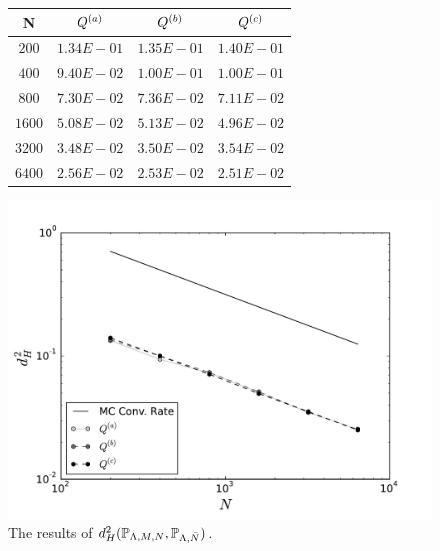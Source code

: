\begin{figure}[h]
\begin{minipage}{.5\textwidth}
\begin{table}[H]
\begin{tabular}{ c | c | c | c }
N & $Q^{(a)}$ & $Q^{(b)}$ & $Q^{(c)}$\\ \hline \hline
$200$ & $1.34E-01$ & $1.35E-01$ & $1.40E-01$\\ \hline 
 
$400$ & $9.40E-02$ & $1.00E-01$ & $1.00E-01$\\ \hline 
 
$800$ & $7.30E-02$ & $7.36E-02$ & $7.11E-02$\\ \hline 
 
$1600$ & $5.08E-02$ & $5.13E-02$ & $4.96E-02$\\ \hline 
 
$3200$ & $3.48E-02$ & $3.50E-02$ & $3.54E-02$\\ \hline 
 
$6400$ & $2.56E-02$ & $2.53E-02$ & $2.51E-02$\\ \hline 
\end{tabular}
\end{table}
\end{minipage}
\begin{minipage}{.45\textwidth}
		\includegraphics[width=\linewidth]{./images/Plot-orth-reg_BigN_40000_reg_M_1_rand_I_100000}
\end{minipage}
\caption{The results of $d^2_H(\mathbb{P}_{{\Lambda}, M, N}, \mathbb{P}_{{\Lambda}, \bar{N}})$.}
\label{fig:M1orth}
\end{figure}


